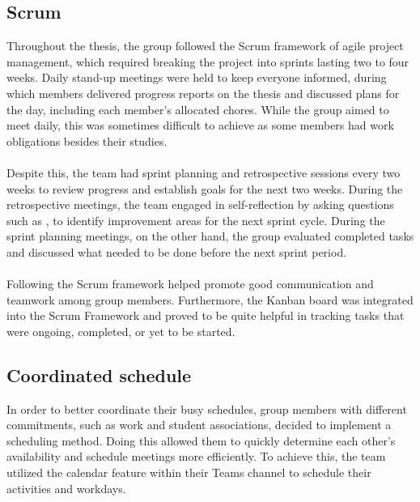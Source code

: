 \subsection{Scrum}
Throughout the thesis, the group followed the Scrum framework of agile project management, which required breaking the project into sprints lasting two to four weeks. Daily stand-up meetings were held to keep everyone informed, during which members delivered progress reports on the thesis and discussed plans for the day, including each member's allocated chores. While the group aimed to meet daily, this was sometimes difficult to achieve as some members had work obligations besides their studies.
\\~\\
Despite this, the team had sprint planning and retrospective sessions every two weeks to review progress and establish goals for the next two weeks. During the retrospective meetings, the team engaged in self-reflection by asking questions such as ,  to identify improvement areas for the next sprint cycle. During the sprint planning meetings, on the other hand, the group evaluated completed tasks and discussed what needed to be done before the next sprint period.
\\~\\
Following the Scrum framework helped promote good communication and teamwork among group members. Furthermore, the Kanban board was integrated into the Scrum Framework and proved to be quite helpful in tracking tasks that were ongoing, completed, or yet to be started. 

\subsection{Coordinated schedule}
In order to better coordinate their busy schedules, group members with different commitments, such as work and student associations, decided to implement a scheduling method. Doing this allowed them to quickly determine each other's availability and schedule meetings more efficiently. To achieve this, the team utilized the calendar feature within their Teams channel to schedule their activities and workdays.

